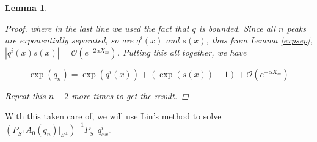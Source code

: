 \documentclass[12pt]{article}
\newtheorem{lemma}{Lemma}
\begin{document}
\begin{lemma}
\begin{proof}
where in the last line we used the fact that $q$ is bounded. Since all $n$ peaks are exponentially separated, so are $q^i(x)$ and $s(x)$, thus from Lemma \ref{expsep}, $\left| q^i(x)s(x) \right| = \mathcal{O}(e^{-2 \alpha X_m})$. Putting this all together, we have

\begin{equation}
\exp(q_n) = \exp( q^i(x)) + (\exp(s(x)) - 1) + \mathcal{O}(e^{-\alpha X_m}) 
\end{equation}

Repeat this $n - 2$ more times to get the result.

\end{proof}
\end{lemma}

With this taken care of, we will use Lin's method to solve $(P_{S^\perp} A_0(q_n) |_{S^\perp})^{-1} P_{S^\perp} q^i_{xx}$.

\end{document}
